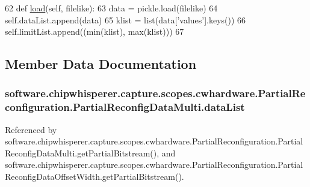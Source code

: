 \begin{DoxyCode}
62     \textcolor{keyword}{def }\hyperlink{classsoftware_1_1chipwhisperer_1_1capture_1_1scopes_1_1cwhardware_1_1PartialReconfiguration_1_1PartialReconfigDataMulti_a7462ebeb4a7c2536a5ed574030c80907}{load}(self, filelike):
63         data = pickle.load(filelike)
64         self.dataList.append(data)
65         klist = list(data[\textcolor{stringliteral}{'values'}].keys())
66         self.limitList.append((min(klist), max(klist)))
67 
\end{DoxyCode}


\subsection{Member Data Documentation}
\hypertarget{classsoftware_1_1chipwhisperer_1_1capture_1_1scopes_1_1cwhardware_1_1PartialReconfiguration_1_1PartialReconfigDataMulti_a2ecab9652c5d5c70416f6da56bdf7c76}{}
\subsubsection[{data\+List}]{\setlength{\rightskip}{0pt plus 5cm}software.\+chipwhisperer.\+capture.\+scopes.\+cwhardware.\+Partial\+Reconfiguration.\+Partial\+Reconfig\+Data\+Multi.\+data\+List}\label{classsoftware_1_1chipwhisperer_1_1capture_1_1scopes_1_1cwhardware_1_1PartialReconfiguration_1_1PartialReconfigDataMulti_a2ecab9652c5d5c70416f6da56bdf7c76}


Referenced by software.\+chipwhisperer.\+capture.\+scopes.\+cwhardware.\+Partial\+Reconfiguration.\+Partial\+Reconfig\+Data\+Multi.\+get\+Partial\+Bitstream(), and software.\+chipwhisperer.\+capture.\+scopes.\+cwhardware.\+Partial\+Reconfiguration.\+Partial\+Reconfig\+Data\+Offset\+Width.\+get\+Partial\+Bitstream().

\hypertarget{classsoftware_1_1chipwhisperer_1_1capture_1_1scopes_1_1cwhardware_1_1PartialReconfiguration_1_1PartialReconfigDataMulti_a37f9fa12008e1e061d085f1548599cdc}{}
